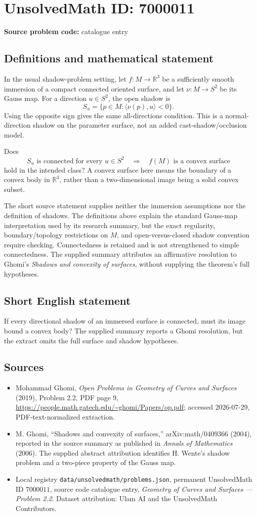 \documentclass[11pt]{article}
\begin{document}
\section*{UnsolvedMath ID: 7000011}
\textbf{Source problem code:} catalogue entry
\subsection{Definitions and mathematical statement}
In the usual shadow-problem setting, let $f:M\to\mathbb R^3$ be a sufficiently smooth immersion of a compact connected oriented surface, and let $\nu:M\to S^2$ be its Gauss map. For a direction $u\in S^2$, the open shadow is
\[
S_u=\{p\in M:\langle\nu(p),u\rangle<0\}.
\]
Using the opposite sign gives the same all-directions condition. This is a normal-direction shadow on the parameter surface, not an added cast-shadow/occlusion model.

Does
\[
S_u\text{ is connected for every }u\in S^2
\quad\Longrightarrow\quad f(M)\text{ is a convex surface}
\]
hold in the intended class? A convex surface here means the boundary of a convex body in $\mathbb R^3$, rather than a two-dimensional image being a solid convex subset.

The short source statement supplies neither the immersion assumptions nor the definition of shadows. The definitions above explain the standard Gauss-map interpretation used by its research summary, but the exact regularity, boundary/topology restrictions on $M$, and open-versus-closed shadow convention require checking. Connectedness is retained and is not strengthened to simple connectedness. The supplied summary attributes an affirmative resolution to Ghomi's \emph{Shadows and convexity of surfaces}, without supplying the theorem's full hypotheses.
\subsection{Short English statement}
If every directional shadow of an immersed surface is connected, must its image bound a convex body? The supplied summary reports a Ghomi resolution, but the extract omits the full surface and shadow hypotheses.
\subsection{Sources}
\begin{itemize}
\item Mohammad Ghomi, \emph{Open Problems in Geometry of Curves and Surfaces} (2019), Problem 2.2, PDF page 9, \url{https://people.math.gatech.edu/~ghomi/Papers/op.pdf}; accessed 2026-07-29, PDF-text-normalized extraction.
\item M. Ghomi, ``Shadows and convexity of surfaces,'' arXiv:math/0409366 (2004), reported in the source summary as published in \emph{Annals of Mathematics} (2006). The supplied abstract attribution identifies H. Wente's shadow problem and a two-piece property of the Gauss map.
\item Local registry \texttt{data/unsolvedmath/problems.json}, permanent UnsolvedMath ID $7000011$, source code catalogue entry, \emph{Geometry of Curves and Surfaces --- Problem 2.2}. Dataset attribution: Ulam AI and the UnsolvedMath Contributors.
\end{itemize}
\end{document}
